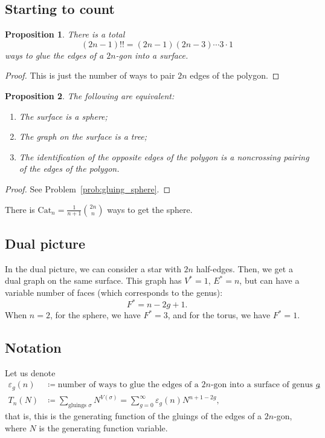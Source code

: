 \documentclass[letterpaper,11pt,oneside,reqno]{article}
\numberwithin{equation}{section}
\newtheorem{proposition}{Proposition}[section]
\theoremstyle{definition}
\begin{document}
\subsection{Starting to count}

\begin{proposition}
	There is a total
	\begin{equation*}
		(2n-1)!!=(2n-1)(2n-3)\cdots 3\cdot 1
	\end{equation*}
	ways to glue the edges of a $2n$-gon into a surface.
\end{proposition}
\begin{proof}
	This is just the number of ways to pair $2n$ edges of the polygon.
\end{proof}

\begin{proposition}
	\label{prop:gluing_sphere}
	The following are equivalent:
	\begin{enumerate}
		\item The surface is a sphere;
		\item The graph on the surface is a tree;
		\item The identification of the opposite edges of the polygon is a \emph{noncrossing pairing} of the edges of the polygon.
	\end{enumerate}
\end{proposition}
\begin{proof}
	See Problem~\ref{prob:gluing_sphere}.
\end{proof}
There is $\mathrm{Cat}_n=\frac{1}{n+1}\binom{2n}{n}$ ways to get the sphere.


\subsection{Dual picture}

In the dual picture, we can consider a star with $2n$ half-edges. Then, we get a dual graph on the
same surface. This graph has $V^*=1$, $E^*=n$, but can have a variable number of faces (which corresponds to the genus):
\begin{equation*}
	F^*=n-2g+1.
\end{equation*}
When $n=2$, for the sphere, we have $F^*=3$, and for the torus, we have $F^*=1$.


\subsection{Notation}

Let us denote
\begin{align*}
	\varepsilon_g(n)
	&\coloneqq\text{number of ways to glue the edges of a $2n$-gon into a surface of genus $g$},\\
	T_n(N)
	&\coloneqq
	\sum_{\text{gluings }\sigma}N^{V(\sigma)}
	=
	\sum_{g=0}^{\infty}\varepsilon_g(n)N^{n+1-2g},
\end{align*}
that is, this is the generating function
of the gluings of the edges of a $2n$-gon, where
$N$ is the generating function variable.
\end{document}
